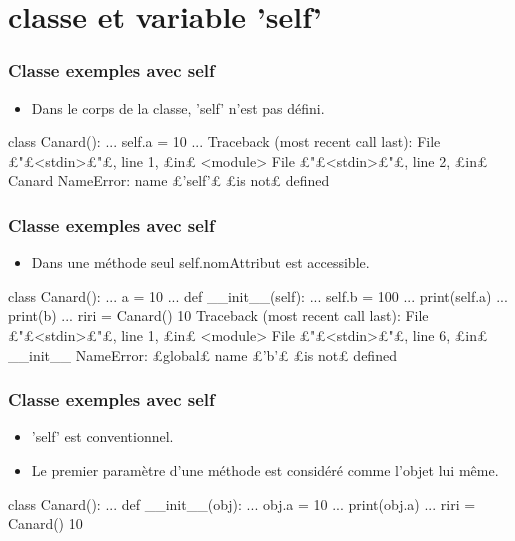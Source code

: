 \section{classe et variable 'self'}
\begin{frame}[fragile]
\frametitle{Classe exemples avec self}
\begin{itemize}
 \item Dans le corps de la classe, 'self' n'est pas défini. 
\end{itemize}
\begin{pythonConsole}
class Canard(): 
...     self.a = 10
... 
Traceback (most recent call last):
 File £"£<stdin>£"£, line 1, £in£ <module>
 File £"£<stdin>£"£, line 2, £in£ Canard
NameError: name £'self'£ £is not£ defined
\end{pythonConsole}
\end{frame}
\begin{frame}[fragile]
\frametitle{Classe exemples avec self}
\begin{itemize}
 \item Dans une méthode seul self.nomAttribut est accessible. 
\end{itemize}
\begin{pythonConsole}
class Canard(): 
...     a = 10
...     def __init__(self): 
...             self.b = 100
...             print(self.a)
...             print(b)
... 
riri = Canard()
10
Traceback (most recent call last):
 File £"£<stdin>£"£, line 1, £in£ <module>
 File £"£<stdin>£"£, line 6, £in£ __init__
NameError: £global£ name £'b'£ £is not£ defined
\end{pythonConsole}
\end{frame}
\begin{frame}[fragile]
\frametitle{Classe exemples avec self}
\begin{itemize}
 \item 'self' est conventionnel. 
 \item Le premier paramètre d'une méthode est considéré comme l'objet lui même. 
\end{itemize}
\begin{pythonConsole}
class Canard(): 
...     def __init__(obj): 
...             obj.a = 10
...             print(obj.a)
... 
riri = Canard()
10
\end{pythonConsole}
\end{frame}
